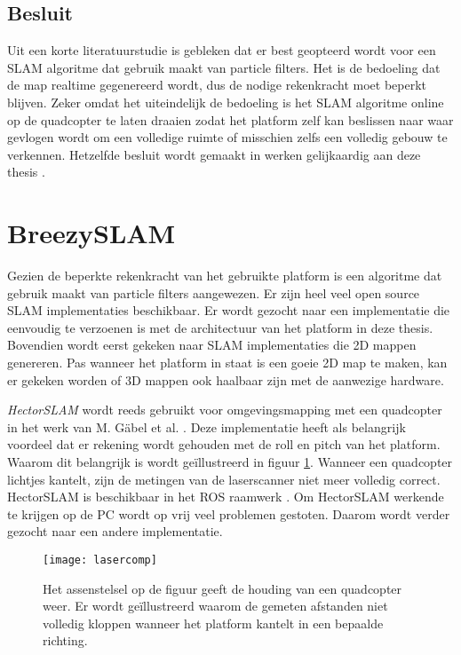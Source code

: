 \subsection{Besluit}
Uit een korte literatuurstudie is gebleken dat er best geopteerd wordt voor een SLAM algoritme dat gebruik maakt van particle filters. Het is de bedoeling dat de map realtime gegenereerd wordt, dus de nodige rekenkracht moet beperkt blijven. Zeker omdat het uiteindelijk de bedoeling is het SLAM algoritme online op de quadcopter te laten draaien zodat het platform zelf kan beslissen naar waar gevlogen wordt om een volledige ruimte of misschien zelfs een volledig gebouw te verkennen. Hetzelfde besluit wordt gemaakt in werken gelijkaardig aan deze thesis \cite{paper:sameasme1} \cite{paper:sameasme2}.

\section{BreezySLAM}
Gezien de beperkte rekenkracht van het gebruikte platform is een algoritme dat gebruik maakt van particle filters aangewezen. Er zijn heel veel open source SLAM implementaties beschikbaar. Er wordt gezocht naar een implementatie die eenvoudig te verzoenen is met de architectuur van het platform in deze thesis. Bovendien wordt eerst gekeken naar SLAM implementaties die 2D mappen genereren. Pas wanneer het platform in staat is een goeie 2D map te maken, kan er gekeken worden of 3D mappen ook haalbaar zijn met de aanwezige hardware.

\npar \textit{HectorSLAM} wordt reeds gebruikt voor omgevingsmapping met een quadcopter in het werk van M. G\"abel et al. \cite{paper:sameasme1}\cite{paper:hectorSLAM}. Deze implementatie heeft als belangrijk voordeel dat er rekening wordt gehouden met de roll en pitch van het platform. Waarom dit belangrijk is wordt ge\"illustreerd in figuur \ref{fig:lasercomp}. Wanneer een quadcopter lichtjes kantelt, zijn de metingen van de laserscanner niet meer volledig correct. HectorSLAM is beschikbaar in het ROS raamwerk \cite{url:hectorROS}. Om HectorSLAM werkende te krijgen op de PC wordt op vrij veel problemen gestoten. Daarom wordt verder gezocht naar een andere implementatie.

\begin{figure}[h]
	\centering
	\texttt{[image: lasercomp]}
	\caption{Het assenstelsel op de figuur geeft de houding van een quadcopter weer. Er wordt ge\"illustreerd waarom de gemeten afstanden niet volledig kloppen wanneer het platform kantelt in een bepaalde richting.} \label{fig:lasercomp}
\end{figure}


